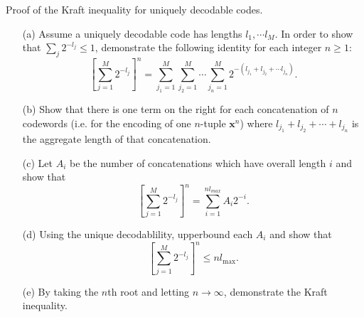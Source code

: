 \documentclass{assignment}
\begin{document}
\begin{prob}[2.11]
    Proof of the Kraft inequality for uniquely decodable codes.
    \begin{itemize}
        \item[(a)] Assume a uniquely decodable code has lengths $l_1,\cdots l_M$. In order to show that $\sum_j2^{-l_j}\leq 1$, demonstrate the following identity for each integer $n\geq 1$:
        \[
            \left[\sum_{j=1}^M2^{-l_j}\right]^n=\sum_{j_1=1}^M\sum_{j_2=1}^M\cdots\sum_{j_n=1}^M2^{-(l_{j_1}+l_{j_2}+\cdots l_{j_n})}.
        \]
        \item[(b)] Show that there is one term on the right for each concatenation of $n$ codewords (i.e. for the encoding of one $n$-tuple $\bm{x}^n$) where $l_{j_1}+l_{j_2}+\cdots+l_{j_n}$ is the aggregate length of that concatenation.
        \item[(c)] Let $A_i$ be the number of concatenations which have overall length $i$ and show that
        \[
            \left[\sum_{j=1}^M2^{-l_j}\right]^n=\sum_{i=1}^{nl_{max}}A_i2^{-i}.
        \]
        \item[(d)] Using the unique decodablility, upperbound each $A_i$ and show that
        \[
            \left[\sum_{j=1}^M2^{-l_j}\right]^n\leq nl_{\max}.
        \]
        \item[(e)] By taking the $n$th root and letting $n\rightarrow\infty$, demonstrate the Kraft inequality.
    \end{itemize}
\end{prob}
\end{document}
